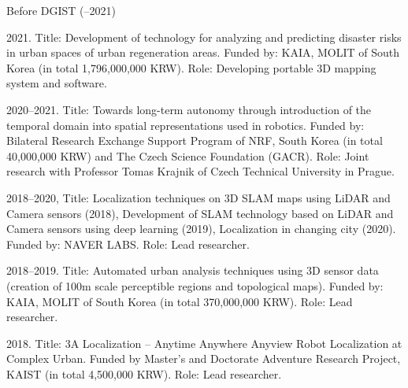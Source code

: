 \begin{pubSubsectionNum}{Before DGIST (--2021)}
    \item 2021. Title: Development of technology for analyzing and predicting disaster risks in urban spaces of urban regeneration areas. Funded by: KAIA, MOLIT of South Korea (in total 1,796,000,000 KRW). Role: Developing portable 3D mapping system and software. 
    \vspace{-1mm}
    \item 2020--2021. Title: Towards long-term autonomy through introduction of the temporal domain into spatial representations used in robotics. Funded by: Bilateral Research Exchange Support Program of NRF, South Korea (in total 40,000,000 KRW) and The Czech Science Foundation (GACR). Role: Joint research with Professor Tomas Krajnik of Czech Technical University in Prague.
    \vspace{-1mm}
    \item 2018--2020, Title: Localization techniques on 3D SLAM maps using LiDAR and Camera sensors (2018), Development of SLAM technology based on LiDAR and Camera sensors using deep learning (2019), Localization in changing city (2020). Funded by: NAVER LABS. Role: Lead researcher.
    \vspace{-1mm}
    \item 2018--2019. Title: Automated urban analysis techniques using 3D sensor data (creation of 100m scale perceptible regions and topological maps). Funded by: KAIA, MOLIT of South Korea (in total 370,000,000 KRW). Role: Lead researcher.
    \vspace{-1mm}
    \item 2018. Title: 3A Localization -- Anytime Anywhere Anyview Robot Localization at Complex Urban. Funded by Master's and Doctorate Adventure Research Project, KAIST (in total 4,500,000 KRW). Role: Lead researcher.
\end{pubSubsectionNum}